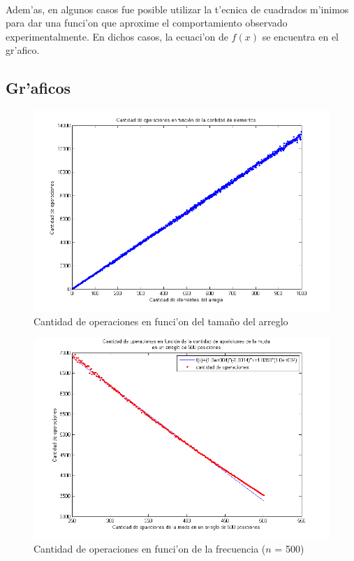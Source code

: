 \paragraph{}
Adem'as, en algunos casos fue posible utilizar la t'ecnica de cuadrados m'inimos para dar una funci'on 
que aproxime el comportamiento observado experimentalmente. En dichos casos, la ecuaci'on de $f(x)$ se encuentra en el gr'afico.

\subsection{Gr'aficos}

\begin{figure}[H]
\centering
\includegraphics[scale=0.7]{../../codigo/ejercicio3/benchmark/graficos/corridas_aleatorias_n_creciente/grafico.png}
\caption{Cantidad de operaciones en funci'on del tama\~{n}o del arreglo}
\label{Ej3fig1}
\end{figure}

\begin{figure}[H]
\centering
\includegraphics[scale=0.7]{../../codigo/ejercicio3/benchmark/graficos/frecuencia/frecuencia.png}
\caption{Cantidad de operaciones en funci'on de la frecuencia ($n$ = 500)}
\label{Ej3fig2}
\end{figure}

